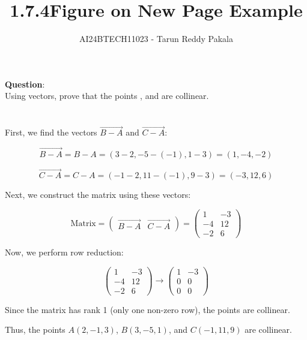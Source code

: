 \documentclass[journal,12pt,onecolumn]{IEEEtran}
\title{1.7.4}
\author{AI24BTECH11023 - Tarun Reddy Pakala}
\theoremstyle{remark}
\begin{document}


\maketitle
\bigskip

\renewcommand{\thefigure}{\theenumi}
\renewcommand{\thetable}{\theenumi}


\textbf{Question}:\\
Using vectors, prove that the points , and  are collinear.\\
\solution\\
\\
First, we find the vectors $\overrightarrow{B-A}$ and $\overrightarrow{C-A}$:

\[
\overrightarrow{B-A} = B - A = (3 - 2, -5 - (-1), 1 - 3) = (1, -4, -2)
\]

\[
\overrightarrow{C-A} = C - A = (-1 - 2, 11 - (-1), 9 - 3) = (-3, 12, 6)
\]

Next, we construct the matrix using these vectors:

\[
\text{Matrix} = 
\begin{pmatrix}
\overrightarrow{B-A} & \overrightarrow{C-A}
\end{pmatrix}
= 
\begin{pmatrix}
1 & -3 \\
-4 & 12 \\
-2 & 6
\end{pmatrix}
\]

Now, we perform row reduction:

\[
\begin{pmatrix}
1 & -3 \\
-4 & 12 \\
-2 & 6
\end{pmatrix}
\rightarrow
\begin{pmatrix}
1 & -3 \\
0 & 0 \\
0 & 0
\end{pmatrix}
\]

Since the matrix has rank 1 (only one non-zero row), the points are collinear.

Thus, the points $A(2, -1, 3)$, $B(3, -5, 1)$, and $C(-1, 11, 9)$ are collinear.

\title{Figure on New Page Example}
\author{}
\date{}
\maketitle
\end{document}
